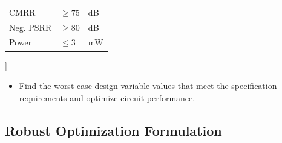 \documentclass[
]{article}
\providecommand{\tightlist}{%
  \setlength{\itemsep}{0pt}\setlength{\parskip}{0pt}}
\begin{document}
\begin{longtable}[]{@{}lll@{}}
\begin{minipage}[t]{0.38\columnwidth}\raggedright
CMRR\strut
\end{minipage} & \begin{minipage}[t]{0.27\columnwidth}\raggedright
\(\geq 75\)\strut
\end{minipage} & \begin{minipage}[t]{0.27\columnwidth}\raggedright
dB\strut
\end{minipage}\tabularnewline
\begin{minipage}[t]{0.38\columnwidth}\raggedright
Neg. PSRR\strut
\end{minipage} & \begin{minipage}[t]{0.27\columnwidth}\raggedright
\(\geq 80\)\strut
\end{minipage} & \begin{minipage}[t]{0.27\columnwidth}\raggedright
dB\strut
\end{minipage}\tabularnewline
\begin{minipage}[t]{0.38\columnwidth}\raggedright
Power\strut
\end{minipage} & \begin{minipage}[t]{0.27\columnwidth}\raggedright
\(\leq 3\)\strut
\end{minipage} & \begin{minipage}[t]{0.27\columnwidth}\raggedright
mW\strut
\end{minipage}\tabularnewline
\bottomrule
\end{longtable}

{]}

\begin{itemize}
\tightlist
\item
  Find the worst-case design variable values that meet the specification requirements and optimize circuit performance.
\end{itemize}

\hypertarget{robust-optimization-formulation}{%
\subsection{Robust Optimization Formulation}\label{robust-optimization-formulation}}
\end{document}
